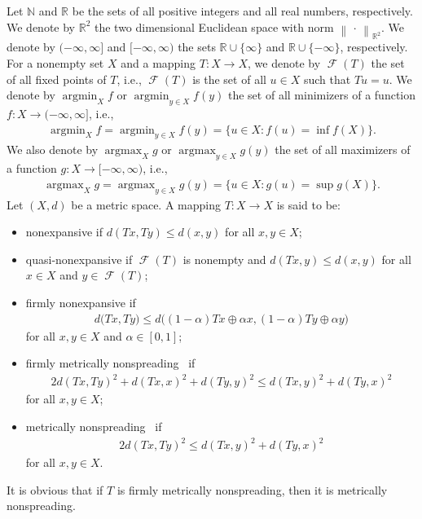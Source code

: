 \documentclass[draft]{amsart}
\numberwithin{equation}{section}
\def\N{\mathbb N}
\def\R{\mathbb R}
\providecommand{\norm}[1]{\left\lVert#1\right\rVert}
\newcommand{\ip}[2]{\left\langle #1, #2 \right\rangle}
\DeclareMathOperator*{\Argmin}{argmin}
\DeclareMathOperator*{\Argmax}{argmax}
\DeclareMathOperator{\Fix}{\mathcal{F}}
\theoremstyle{plain}
\theoremstyle{definition}
\theoremstyle{remark}
\begin{document}
Let $\N$ and $\R$ be the sets of all positive integers and 
all real numbers, respectively. We denote by $\R^2$ 
the two dimensional Euclidean space with 
norm $\norm{\,\cdot \,}_{\R^2}$. 
We denote by $(-\infty, \infty]$ and $[-\infty, \infty)$ 
the sets $\R \cup \{\infty\}$ and $\R \cup \{-\infty\}$, respectively. 
For a nonempty set $X$ and a mapping $T\colon X\to X$, 
we denote by $\Fix(T)$ the set of all fixed points of $T$, i.e., 
$\Fix(T)$ is the set of all $u\in X$ such that $Tu=u$.  
We denote by $\Argmin_X f$ or $\Argmin_{y\in X}f(y)$ 
the set of all minimizers of a function $f\colon X\to (-\infty, \infty]$, i.e., 
\begin{align}
 \Argmin_X f = \Argmin_{y\in X}f(y) = \bigl\{u\in X: f(u)=\inf f(X)\bigr\}. 
\end{align}
We also denote by $\Argmax_X g$ or $\Argmax_{y\in X}g(y)$ 
the set of all maximizers of a function $g\colon X\to [-\infty, \infty)$, i.e., 
\begin{align}
 \Argmax_X g = \Argmax_{y\in X}g(y) = \bigl\{u\in X: g(u)=\sup g(X)\bigr\}. 
\end{align}
Let $(X,d)$ be a metric space. A mapping $T\colon X\to X$ is said to be:
\begin{itemize}
 \item nonexpansive if $d(Tx,Ty)\leq d(x,y)$ 
for all $x,y\in X$; 
 \item quasi-nonexpansive if 
$\Fix(T)$ is nonempty and $d(Tx,y)\leq d(x,y)$ 
for all $x\in X$ and $y\in \Fix(T)$; 
 \item firmly nonexpansive if 
\begin{align}
 d\bigl(Tx,Ty\bigr) \leq d\bigl((1-\alpha)Tx\oplus \alpha x, 
 (1-\alpha) Ty \oplus \alpha y\bigr)
\end{align}
 for all $x,y\in X$ and $\alpha \in [0,1]$; 
\fi
 \item firmly metrically nonspreading~\cite{MR4021035} if 
\begin{align}
 2d(Tx,Ty)^2 +d(Tx,x)^2 + d(Ty,y)^2 
 \leq d(Tx,y)^2 + d(Ty,x)^2
\end{align}
 for all $x,y\in X$; 
 \item metrically nonspreading~\cite{MR4021035} if 
\begin{align}
 2d(Tx,Ty)^2 \leq d(Tx,y)^2 + d(Ty,x)^2
\end{align}
 for all $x,y\in X$. 
\end{itemize}
It is obvious that if $T$ is firmly metrically nonspreading, then 
it is metrically nonspreading. 
\end{document}
